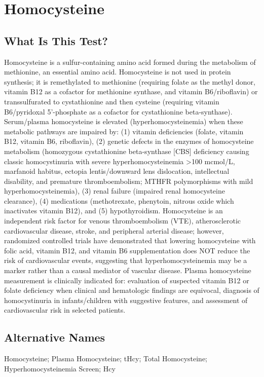 \chapter{Homocysteine}
\section*{What Is This Test?}
Homocysteine is a sulfur-containing amino acid formed during the metabolism of methionine, an essential amino acid. Homocysteine is not used in protein synthesis; it is remethylated to methionine (requiring folate as the methyl donor, vitamin B12 as a cofactor for methionine synthase, and vitamin B6/riboflavin) or transsulfurated to cystathionine and then cysteine (requiring vitamin B6/pyridoxal 5'-phosphate as a cofactor for cystathionine beta-synthase). Serum/plasma homocysteine is elevated (hyperhomocysteinemia) when these metabolic pathways are impaired by: (1) vitamin deficiencies (folate, vitamin B12, vitamin B6, riboflavin), (2) genetic defects in the enzymes of homocysteine metabolism (homozygous cystathionine beta-synthase [CBS] deficiency causing classic homocystinuria with severe hyperhomocysteinemia >100 mcmol/L, marfanoid habitus, ectopia lentis/downward lens dislocation, intellectual disability, and premature thromboembolism; MTHFR polymorphisms with mild hyperhomocysteinemia), (3) renal failure (impaired renal homocysteine clearance), (4) medications (methotrexate, phenytoin, nitrous oxide which inactivates vitamin B12), and (5) hypothyroidism. Homocysteine is an independent risk factor for venous thromboembolism (VTE), atherosclerotic cardiovascular disease, stroke, and peripheral arterial disease; however, randomized controlled trials have demonstrated that lowering homocysteine with folic acid, vitamin B12, and vitamin B6 supplementation does NOT reduce the risk of cardiovascular events, suggesting that hyperhomocysteinemia may be a marker rather than a causal mediator of vascular disease. Plasma homocysteine measurement is clinically indicated for: evaluation of suspected vitamin B12 or folate deficiency when clinical and hematologic findings are equivocal, diagnosis of homocystinuria in infants/children with suggestive features, and assessment of cardiovascular risk in selected patients.
\section*{Alternative Names}
Homocysteine; Plasma Homocysteine; tHcy; Total Homocysteine; Hyperhomocysteinemia Screen; Hcy

